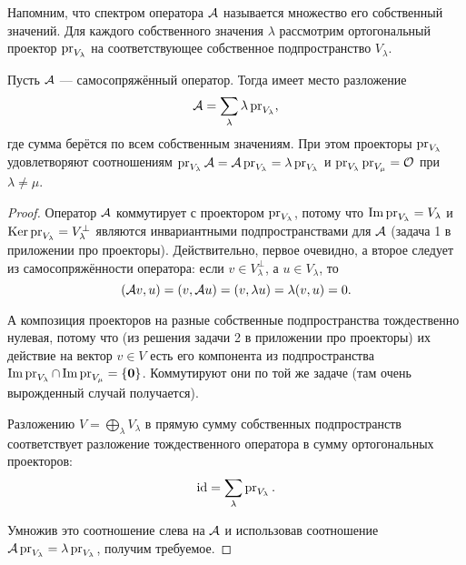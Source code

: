 Напомним, что спектром оператора $\mathcal{A}$ называется множество его собственный значений. Для каждого собственного значения $\lambda$ рассмотрим ортогональный проектор $\operatorname{pr}_{V_\lambda}$ на соответствующее собственное подпространство $V_\lambda$.

\begin{theorem}
    Пусть $\mathcal{A}$ --- самосопряжённый оператор. Тогда имеет место разложение
    \[
        \mathcal{A} = \sum_\lambda\lambda\operatorname{pr}_{V_\lambda},
    \]
    где сумма берётся по всем собственным значениям. При этом проекторы $\operatorname{pr}_{V_\lambda}$ удовлетворяют соотношениям $\operatorname{pr}_{V_\lambda}\mathcal{A} = \mathcal{A}\operatorname{pr}_{V_\lambda} = \lambda\operatorname{pr}_{V_\lambda}$ и $\operatorname{pr}_{V_\lambda}\operatorname{pr}_{V_\mu} = \mathcal{O}$ при $\lambda \ne \mu$.
\end{theorem}

\begin{proof}
    Оператор $\mathcal{A}$ коммутирует с проектором $\operatorname{pr}_{V_\lambda}$, потому что $\operatorname{Im}\operatorname{pr}_{V_\lambda} = V_\lambda$ и $\operatorname{Ker}\operatorname{pr}_{V_\lambda} = V_\lambda^\perp$ являются инвариантными подпространствами для $\mathcal{A}$ (задача 1 в приложении про проекторы). Действительно, первое очевидно, а второе следует из самосопряжённости оператора: если $v \in V_\lambda^\perp$, а $u \in V_\lambda$, то
    \[
        (\mathcal{A} v, u) = (v, \mathcal{A} u) = (v, \lambda u) = \lambda (v, u) = 0.
    \]

    А композиция проекторов на разные собственные подпространства тождественно нулевая, потому что (из решения задачи 2 в приложении про проекторы) их действие на вектор $v \in V$ есть его компонента из подпространства $\operatorname{Im}\operatorname{pr}_{V_\lambda} \cap \operatorname{Im}\operatorname{pr}_{V_\mu} = \{\boldsymbol{0}\}$. Коммутируют они по той же задаче (там очень вырожденный случай получается).

    Разложению $V = \bigoplus\limits_\lambda V_\lambda$ в прямую сумму собственных подпространств соответствует разложение тождественного оператора в сумму ортогональных проекторов:
    \[
        \mathrm{id} = \sum_\lambda\operatorname{pr}_{V_\lambda}.
    \]

    Умножив это соотношение слева на $\mathcal{A}$ и использовав соотношение $\mathcal{A}\operatorname{pr}_{V_\lambda} = \lambda\operatorname{pr}_{V_{\lambda}}$, получим требуемое.
\end{proof}

